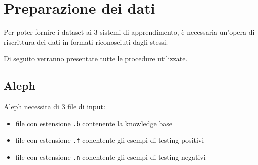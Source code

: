 \section{Preparazione dei dati}
Per poter fornire i dataset ai 3 sistemi di apprendimento, è necessaria un'opera di riscrittura dei dati in formati riconosciuti dagli stessi.

Di seguito verranno presentate tutte le procedure utilizzate.


\subsection{Aleph}
Aleph necessita di 3 file di input:
\begin{itemize}
\item file con estensione \verb+.b+ contenente la knowledge base
\item file con estensione \verb+.f+ conentente gli esempi di testing positivi
\item file con estensione \verb+.n+ conentente gli esempi di testing negativi
\end{itemize}